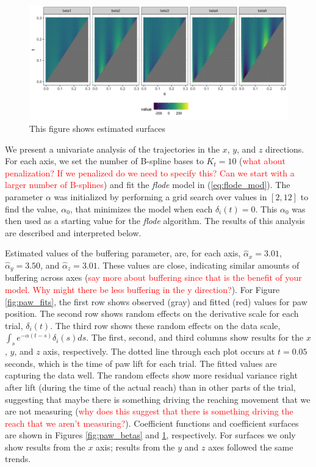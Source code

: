\documentclass[preprint]{JASA}
\begin{document}
\begin{figure}
\includegraphics[width=\reprintcolumnwidth]{figs/fig_data_surfaces-1} \caption{This figure shows estimated surfaces}\label{fig:paw_surfaces}
\end{figure}

We present a univariate analysis of the trajectories in the \(x\),
\(y\), and \(z\) directions. For each axis, we set the number of
B-spline bases to \(K_t = 10\)
(\textcolor{red}{what about penalization? If we penalized do we need to specify this? Can we start with a larger number of B-splines})
and fit the \emph{flode} model in (\ref{eq:flode_mod}). The parameter
\(\alpha\) was initialized by performing a grid search over values in
\([2, 12]\) to find the value, \(\alpha_0\), that minimizes the model
when each \(\delta_i(t) = 0\). This \(\alpha_0\) was then used as a
starting value for the \emph{flode} algorithm. The results of this
analysis are described and interpreted below.

Estimated values of the buffering parameter, are, for each axis,
\(\widehat{\alpha}_x = 3.01\), \(\widehat{\alpha}_y = 3.50\), and
\(\widehat{\alpha}_z = 3.01\). These values are close, indicating
similar amounts of buffering across axes
(\textcolor{red}{say more about buffering since that is the benefit of your model. Why might there be less buffering in the y direction?}).
For Figure \ref{fig:paw_fits}, the first row shows observed (gray) and
fitted (red) values for paw position. The second row shows random
effects on the derivative scale for each trial, \(\delta_i(t)\). The
third row shows these random effects on the data scale,
\(\int_s e^{-\alpha (t-s)}\delta_i(s)ds\). The first, second, and third
columns show results for the \(x\), \(y\), and \(z\) axis, respectively.
The dotted line through each plot occurs at \(t= 0.05\) seconds, which
is the time of paw lift for each trial. The fitted values are capturing
the data well. The random effects show more residual variance right
after lift (during the time of the actual reach) than in other parts of
the trial, suggesting that maybe there is something driving the reaching
movement that we are not measuring
(\textcolor{red}{why does this suggest that there is something driving the reach that we aren't measuring?}).
Coefficient functions and coefficient surfaces are shown in Figures
\ref{fig:paw_betas} and \ref{fig:paw_surfaces}, respectively. For
surfaces we only show results from the \(x\) axis; results from the
\(y\) and \(z\) axes followed the same trends.
\end{document}
